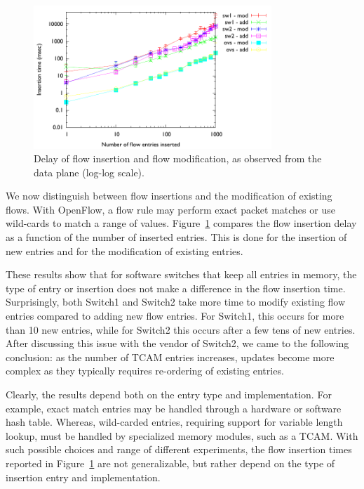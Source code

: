 \begin{figure}[h]
  \begin{center}
    \includegraphics[width=0.80\textwidth]{flow_insertion_delay}
  \end{center}
  \caption{Delay of flow insertion and flow modification, as observed
    from the data plane (log-log scale).}
  \label{fig:flow_insertion_delay}
\end{figure}

We now distinguish between flow insertions and the modification of existing
flows.  With OpenFlow, a flow rule may perform exact packet matches or use
wild-cards to match a range of values. Figure~\ref{fig:flow_insertion_delay}
compares the flow insertion delay as a function of the number of inserted
entries. This is done for the insertion of new entries and for the modification
of existing entries.

These results show that for software switches that keep all entries in memory,
the type of entry or insertion does not make a difference in the flow insertion
time.  Surprisingly, both Switch1 and Switch2 take more time to modify existing
flow entries compared to adding new flow entries.  For Switch1, this occurs for
more than 10 new entries, while for Switch2 this occurs after a few tens of new
entries.  After discussing this issue with the vendor of Switch2, we came to the
following conclusion: as the number of TCAM entries increases, updates become
more complex as they typically requires re-ordering of existing entries.

Clearly, the results depend both on the entry type and implementation.  For
example, exact match entries may be handled through a hardware or software hash
table. Whereas, wild-carded entries, requiring support for variable length
lookup, must be handled by specialized memory modules, such as a TCAM. With such
possible choices and range of different experiments, the flow insertion times
reported in Figure~\ref{fig:flow_insertion_delay} are not generalizable, but
rather depend on the type of insertion entry and implementation.


